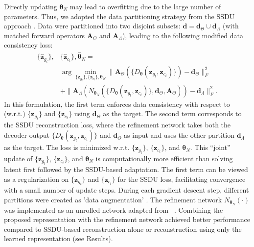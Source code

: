\documentclass[journal,twoside,web]{ieeecolor}
\begin{document}
Directly updating $\boldsymbol{\theta}_N$ may lead to overfitting due to the large number of parameters. Thus, we adopted the data partitioning strategy from the SSDU approach \cite{yaman2020self}. Data were partitioned into two disjoint subsets: $\mathbf{d}=\mathbf{d}_\Theta \cup \mathbf{d}_\Lambda$ (with matched forward operators $\mathbf{A}_\Theta$ and $\mathbf{A}_\Lambda$), leading to the following modified data consistency loss:
\begin{equation}
\begin{split}
\{\hat{\mathbf{z}}_{g_t}\},&\{\hat{\mathbf{z}}_{c_t}\},\hat{\boldsymbol{\theta}}_N = \\& 
\arg \underset{\{\mathbf{z}_{g_t}\},\{\mathbf{z}_{c_t}\},\boldsymbol{\theta}_N}{\operatorname{min}}
\|\mathbf{A}_\Theta(\{D_{\boldsymbol{\theta}}(\mathbf{z}_{g_t},\mathbf{z}_{c_t})\})-\mathbf{d}_\Theta\|_F^2
\\&+
\|\mathbf{A}_\Lambda(N_{\boldsymbol{\theta}_N}(\{D_{\boldsymbol{\theta}}(\mathbf{z}_{g_t},\mathbf{z}_{c_t})\},\mathbf{d}_\Theta,\mathbf{A}_\Theta))-\mathbf{d}_\Lambda\|_F^2.
\label{recon_alg_adapt}
\end{split}
\end{equation}
In this formulation, the first term enforces data consistency with respect to (w.r.t.) $\{\mathbf{z}_{g_t}\}$ and $\{\mathbf{z}_{c_t}\}$ using $\mathbf{d}_\Theta$ as the target. The second term corresponds to the SSDU reconstruction loss, where the refinement network takes both the decoder output $\{D_{\boldsymbol{\theta}}(\mathbf{z}_{g_t},\mathbf{z}_{c_t})\}$ and $\mathbf{d}_\Theta$ as input and uses the other partition $\mathbf{d}_\Lambda$ as the target. The loss is minimized w.r.t. $\{\mathbf{z}_{g_t}\}$, $\{\mathbf{z}_{c_t}\}$, and $\boldsymbol{\theta}_N$. This ``joint'' update of $\{\mathbf{z}_{g_t}\}$, $\{\mathbf{z}_{c_t}\}$, and $\boldsymbol{\theta}_N$ is computationally more efficient than solving latent first followed by the SSDU-based adaptation. The first term can be viewed as a regularization on $\{\mathbf{z}_{g_t}\}$ and $\{\mathbf{z}_{c_t}\}$ for the SSDU loss, facilitating convergence with a small number of update steps. During each gradient descent step, different partitions were created as 'data augmentation' \cite{yaman2022zero}. The refinement network $N_{\boldsymbol{\theta}_N}(\cdot)$ was implemented as an unrolled network adapted from ~\cite{MoDL}. Combining the proposed representation with the refinement network achieved better performance compared to SSDU-based reconstruction alone or reconstruction using only the learned representation (see Results).
\end{document}
